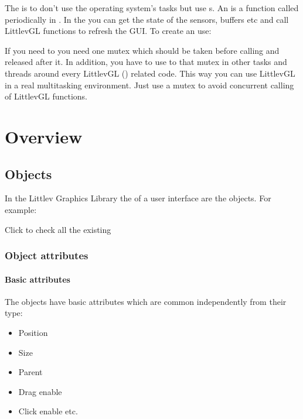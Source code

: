 \documentclass[letterpaper,10pt,english]{sphinxmanual}
\begin{document}
The  is to don’t use the operating system’s tasks but use s. An  is a function called periodically in .
In the  you can get the state of the sensors, buffers etc and call LittlevGL functions to refresh the GUI.
To create an  use: 

If you need to  you need one mutex which should be taken before calling  and released after it.
In addition, you have to use to that mutex in other tasks and threads around every LittlevGL () related code.
This way you can use LittlevGL in a real multitasking environment. Just use a mutex to avoid concurrent calling of LittlevGL functions.


\section{Overview}
\label{\detokenize{overview/index::doc}}\label{\detokenize{overview/index:overview}}

\subsection{Objects}
\label{\detokenize{overview/objects::doc}}\label{\detokenize{overview/objects:objects}}
In the Littlev Graphics Library the  of a user interface are the objects. For example:

Click to check all the existing  


\subsubsection{Object attributes}
\label{\detokenize{overview/objects:object-attributes}}

\paragraph{Basic attributes}
\label{\detokenize{overview/objects:basic-attributes}}
The objects have basic attributes which are common independently from their type:
\begin{itemize}
\item {} 
Position

\item {} 
Size

\item {} 
Parent

\item {} 
Drag enable

\item {} 
Click enable etc.

\end{itemize}
\end{document}

